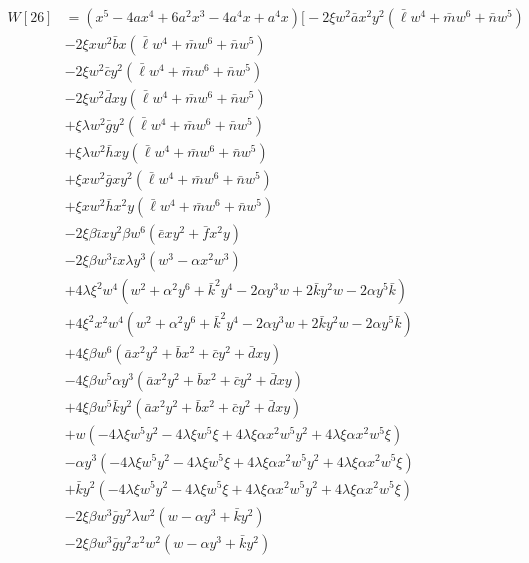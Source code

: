 \begin{align}
W[26] &= (x^5-4ax^4+6a^2x^3-4a^4x+a^4x)\biggl[-2\xi w^2\bar a x^2 y^2(\bar \ell  w^4 + \bar m  w^6 + \bar n  w^5) \\
&- 2\xi xw^2\bar b x(\bar \ell  w^4 + \bar m  w^6 + \bar n  w^5) \\
&- 2\xi w^2\bar c y^2 (\bar \ell  w^4 + \bar m  w^6 + \bar n  w^5)\\
&- 2\xi w^2\bar d xy (\bar \ell  w^4 + \bar m  w^6 + \bar n  w^5) \\
&+ \xi \lambda w^2\bar g y^2 (\bar \ell  w^4 + \bar m  w^6 + \bar n  w^5)\\
&+ \xi \lambda w^2\bar h x y(\bar \ell  w^4 + \bar m  w^6 + \bar n  w^5)\\
&+ \xi x w^2\bar g xy^2 (\bar \ell  w^4 + \bar m  w^6 + \bar n  w^5)
 \\
&+ \xi x w^2\bar h x^2 y(\bar \ell  w^4 + \bar m  w^6 + \bar n  w^5)\\
&-2\xi \beta \bar \iota x y^2\beta w^6 (\bar e xy^2 + \bar f x^2 y) \\
&- 2\xi \beta w^3 \bar \iota x \lambda y^3 (w^3 - \alpha x^2 w^3) \\
&+4\lambda\xi^2 w^4 (  w^2 + \alpha^2 y^6  + \bar k^2 y^4  - 2  \alpha y^3  w + 2 \bar k y^2 w - 2 \alpha y^5  \bar k) \\
&+4\xi^2 x^2w^4 (  w^2 + \alpha^2 y^6  + \bar k^2 y^4  - 2  \alpha y^3  w + 2 \bar k y^2 w - 2 \alpha y^5  \bar k)  \\
&+  4 \xi\beta w^6  (\bar a x^2 y^2 + \bar b x^2 + \bar c y^2 + \bar d xy ) \\
&- 4 \xi\beta w^5\alpha y^3 (\bar a x^2 y^2 + \bar b x^2 + \bar c y^2 + \bar d xy ) \\
&+ 4 \xi\beta w^5\bar k y^2 (\bar a x^2 y^2 + \bar b x^2 + \bar c y^2 + \bar d xy ) \\
&+  w (-4 \lambda \xi w^5 y^2  -4 \lambda \xi w^5 \xi  +4 \lambda \xi \alpha x^2 w^5 y^2  + 4 \lambda \xi \alpha x^2 w^5 \xi ) \\
&- \alpha y^3  (-4 \lambda \xi w^5 y^2  -4 \lambda \xi w^5 \xi  +4 \lambda \xi \alpha x^2 w^5 y^2  + 4 \lambda \xi \alpha x^2 w^5 \xi ) \\
&+ \bar k y^2  (-4 \lambda \xi w^5 y^2  -4 \lambda \xi w^5 \xi  +4 \lambda \xi \alpha x^2 w^5 y^2  + 4 \lambda \xi \alpha x^2 w^5 \xi ) \\
&-2 \xi\beta w^3 \bar g y^2\lambda w^2 (  w - \alpha y^3  + \bar k y^2 )   \\
&-2 \xi\beta w^3 \bar g y^2 x^2 w^2 (  w - \alpha y^3  + \bar k y^2 ) \\

\end{align}
